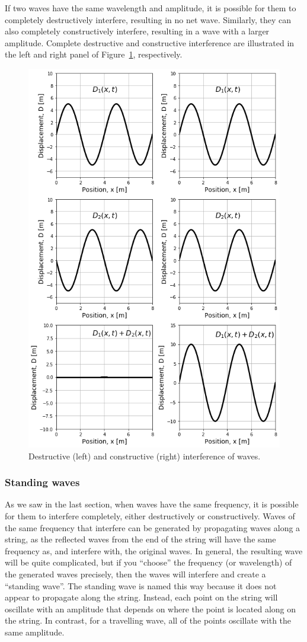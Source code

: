 If two waves have the same wavelength and amplitude, it is possible for them to completely destructively interfere, resulting in no net wave. Similarly, they can also completely constructively interfere, resulting in a wave with a larger amplitude. Complete destructive and constructive interference are illustrated in the left and right panel of Figure~\ref{fig:waves:interference}, respectively.

\begin{figure}[!htbp]
\centering
\includegraphics[width=0.7\linewidth]{files/interference-abb5ab7de5dbb86607a9e3c87ada0366.png}
\caption[]{Destructive (left) and constructive (right) interference of waves.}
\label{fig:waves:interference}
\end{figure}

\subsubsection{Standing waves}

As we saw in the last section, when waves have the same frequency, it is possible for them to interfere completely, either destructively or constructively. Waves of the same frequency that interfere can be generated by propagating waves along a string, as the reflected waves from the end of the string will have the same frequency as, and interfere with, the original waves. In general, the resulting wave will be quite complicated, but if you ``choose'' the frequency (or wavelength) of the generated waves precisely, then the waves will interfere and create a ``standing wave''. The standing wave is named this way because it does not appear to propagate along the string. Instead, each point on the string will oscillate with an amplitude that depends on where the point is located along on the string. In contrast, for a travelling wave, all of the points oscillate with the same amplitude.

